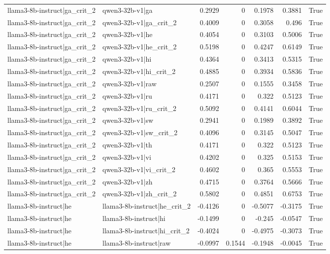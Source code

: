 \begin{table}
\begin{tabular}{l l r r r r l}
llama3-8b-instruct|ga_crit_2 & qwen3-32b-v1|ga & 0.2929 & 0 & 0.1978 & 0.3881 & True \\
llama3-8b-instruct|ga_crit_2 & qwen3-32b-v1|ga_crit_2 & 0.4009 & 0 & 0.3058 & 0.496 & True \\
llama3-8b-instruct|ga_crit_2 & qwen3-32b-v1|he & 0.4054 & 0 & 0.3103 & 0.5006 & True \\
llama3-8b-instruct|ga_crit_2 & qwen3-32b-v1|he_crit_2 & 0.5198 & 0 & 0.4247 & 0.6149 & True \\
llama3-8b-instruct|ga_crit_2 & qwen3-32b-v1|hi & 0.4364 & 0 & 0.3413 & 0.5315 & True \\
llama3-8b-instruct|ga_crit_2 & qwen3-32b-v1|hi_crit_2 & 0.4885 & 0 & 0.3934 & 0.5836 & True \\
llama3-8b-instruct|ga_crit_2 & qwen3-32b-v1|raw & 0.2507 & 0 & 0.1555 & 0.3458 & True \\
llama3-8b-instruct|ga_crit_2 & qwen3-32b-v1|ru & 0.4171 & 0 & 0.322 & 0.5123 & True \\
llama3-8b-instruct|ga_crit_2 & qwen3-32b-v1|ru_crit_2 & 0.5092 & 0 & 0.4141 & 0.6044 & True \\
llama3-8b-instruct|ga_crit_2 & qwen3-32b-v1|sw & 0.2941 & 0 & 0.1989 & 0.3892 & True \\
llama3-8b-instruct|ga_crit_2 & qwen3-32b-v1|sw_crit_2 & 0.4096 & 0 & 0.3145 & 0.5047 & True \\
llama3-8b-instruct|ga_crit_2 & qwen3-32b-v1|th & 0.4171 & 0 & 0.322 & 0.5123 & True \\
llama3-8b-instruct|ga_crit_2 & qwen3-32b-v1|vi & 0.4202 & 0 & 0.325 & 0.5153 & True \\
llama3-8b-instruct|ga_crit_2 & qwen3-32b-v1|vi_crit_2 & 0.4602 & 0 & 0.365 & 0.5553 & True \\
llama3-8b-instruct|ga_crit_2 & qwen3-32b-v1|zh & 0.4715 & 0 & 0.3764 & 0.5666 & True \\
llama3-8b-instruct|ga_crit_2 & qwen3-32b-v1|zh_crit_2 & 0.5802 & 0 & 0.4851 & 0.6753 & True \\
llama3-8b-instruct|he & llama3-8b-instruct|he_crit_2 & -0.4126 & 0 & -0.5077 & -0.3175 & True \\
llama3-8b-instruct|he & llama3-8b-instruct|hi & -0.1499 & 0 & -0.245 & -0.0547 & True \\
llama3-8b-instruct|he & llama3-8b-instruct|hi_crit_2 & -0.4024 & 0 & -0.4975 & -0.3073 & True \\
llama3-8b-instruct|he & llama3-8b-instruct|raw & -0.0997 & 0.1544 & -0.1948 & -0.0045 & True \\

\end{tabular}
\end{table}
